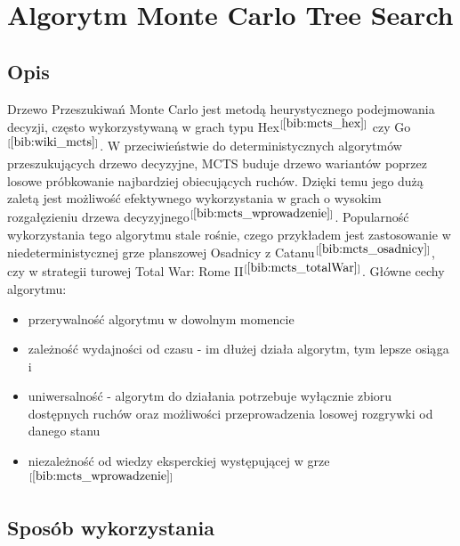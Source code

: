 \section{Algorytm Monte Carlo Tree Search}
\label{sec:mcts}

\subsection{Opis}

Drzewo Przeszukiwań Monte Carlo jest metodą heurystycznego podejmowania decyzji, często wykorzystywaną w grach typu Hex$^{[\ref{bib:mcts_hex}]}$ czy Go$^{[\ref{bib:wiki_mcts}]}$. W przeciwieństwie do deterministycznych algorytmów przeszukujących drzewo decyzyjne, MCTS buduje drzewo wariantów poprzez losowe próbkowanie najbardziej obiecujących ruchów. Dzięki temu jego dużą zaletą jest możliwość efektywnego wykorzystania w grach o wysokim rozgałęzieniu drzewa decyzyjnego$^{[\ref{bib:mcts_wprowadzenie}]}$. Popularność wykorzystania tego algorytmu stale rośnie, czego przykładem jest zastosowanie w niedeterministycznej grze planszowej Osadnicy z Catanu$^{[\ref{bib:mcts_osadnicy}]}$, czy w strategii turowej Total War: Rome II$^{[\ref{bib:mcts_totalWar}]}$. Główne cechy algorytmu:
\begin{itemize}
	\item przerywalność algorytmu w dowolnym momencie
	\item zależność wydajności od czasu - im dłużej działa algorytm, tym lepsze osiąga i
	\item uniwersalność - algorytm do działania potrzebuje wyłącznie zbioru dostępnych ruchów oraz możliwości przeprowadzenia losowej rozgrywki od danego stanu
	\item niezależność od wiedzy eksperckiej występującej w grze $^{[\ref{bib:mcts_wprowadzenie}]}$
\end{itemize}

\subsection{Sposób wykorzystania}

